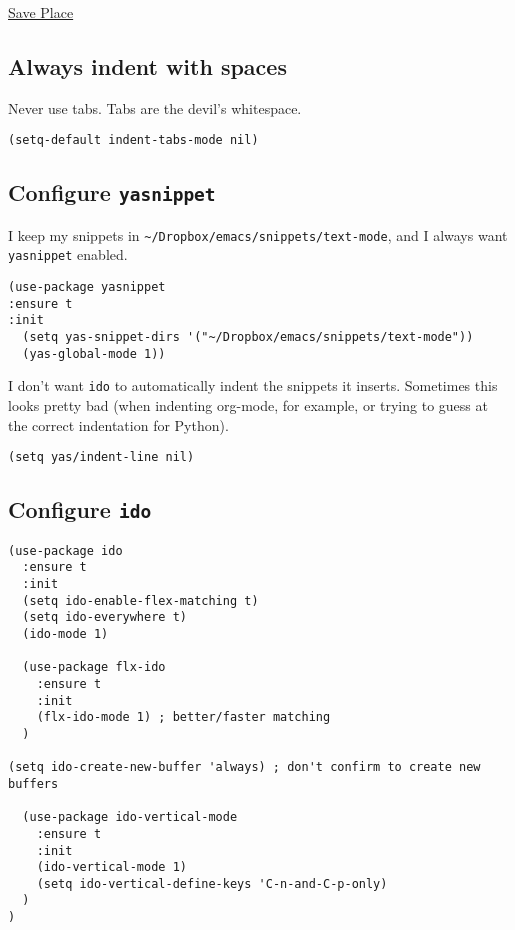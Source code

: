 \documentclass[11pt]{article}
\begin{document}
\href{https://www.emacswiki.org/emacs/SavePlace}{Save Place}
\subsection{Always indent with spaces}
\label{sec:orgfe533d7}

Never use tabs. Tabs are the devil’s whitespace.

\begin{verbatim}
(setq-default indent-tabs-mode nil)
\end{verbatim}

\subsection{Configure \texttt{yasnippet}}
\label{sec:org7c4554b}

I keep my snippets in \texttt{\textasciitilde{}/Dropbox/emacs/snippets/text-mode}, and I always want \texttt{yasnippet} enabled.

\begin{verbatim}
(use-package yasnippet
:ensure t
:init
  (setq yas-snippet-dirs '("~/Dropbox/emacs/snippets/text-mode"))
  (yas-global-mode 1))
\end{verbatim}

I don’t want \texttt{ido} to automatically indent the snippets it inserts. Sometimes this looks pretty bad (when indenting org-mode, for example, or trying to guess at the correct indentation for Python).

\begin{verbatim}
(setq yas/indent-line nil)
\end{verbatim}
\subsection{Configure \texttt{ido}}
\label{sec:org7b3134b}

\begin{verbatim}
(use-package ido
  :ensure t
  :init
  (setq ido-enable-flex-matching t)
  (setq ido-everywhere t)
  (ido-mode 1)

  (use-package flx-ido
    :ensure t
    :init
    (flx-ido-mode 1) ; better/faster matching
  )

(setq ido-create-new-buffer 'always) ; don't confirm to create new buffers

  (use-package ido-vertical-mode
    :ensure t
    :init
    (ido-vertical-mode 1)
    (setq ido-vertical-define-keys 'C-n-and-C-p-only)
  )
)
\end{verbatim}
\end{document}
